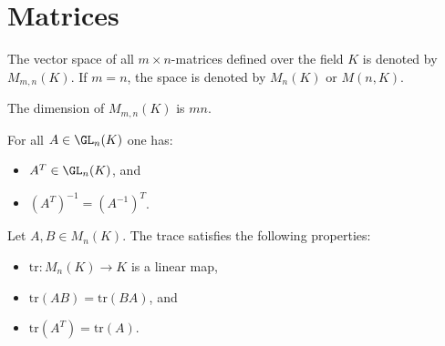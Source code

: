 \section{Matrices}

    \begin{notation}\label{linalgebra:matrix_set}
        The vector space of all $m\times n$-matrices defined over the field $K$ is denoted by $M_{m,n}(K)$. If $m=n$, the space is denoted by $M_n(K)$ or $M(n,K)$.
    \end{notation}

    \begin{property}[Dimension]\label{linalgebra:dimension_of_matrix_space}
        The dimension of $M_{m,n}(K)$ is $mn$.
    \end{property}

    \begin{property}
        For all $A\in\GL_n(K)$ one has:
        \begin{itemize}
            \item $A^T\in\GL_n(K)$, and
            \item $\left(A^T\right)^{-1}=\left(A^{-1}\right)^T$.
        \end{itemize}
    \end{property}

    \begin{property}\label{linalgebra:trace_commutative}
        Let $A,B\in M_n(K)$. The trace satisfies the following properties:
        \begin{itemize}
            \item $\mathrm{tr}:M_n(K)\rightarrow K$ is a linear map,
            \item $\mathrm{tr}(AB) = \mathrm{tr}(BA)$, and
            \item $\mathrm{tr}(A^T) = \mathrm{tr}(A)$.
        \end{itemize}
    \end{property}

